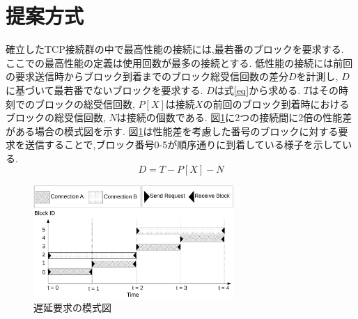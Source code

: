 \documentclass{ltjsarticle}
\begin{document}
\section{提案方式}
\vspace{-3mm}
確立したTCP接続群の中で最高性能の接続には,最若番のブロックを要求する.
ここでの最高性能の定義は使用回数が最多の接続とする.
低性能の接続には前回の要求送信時からブロック到着までのブロック総受信回数の差分\begin{math}D\end{math}を計測し,
\begin{math}D\end{math}に基づいて最若番でないブロックを要求する.
\begin{math}D\end{math}は式\ref{eq}から求める.
\begin{math}T\end{math}はその時刻でのブロックの総受信回数,
\begin{math}P[X]\end{math}は接続\begin{math}X\end{math}の前回のブロック到着時におけるブロックの総受信回数,
\begin{math}N\end{math}は接続の個数である.
図\ref{delay}に2つの接続間に2倍の性能差がある場合の模式図を示す.
図\ref{delay}は性能差を考慮した番号のブロックに対する要求を送信することで,ブロック番号0-5が順序通りに到着している様子を示している.
\vspace{-4.5mm}
\begin{equation}
	\label{eq}
	D = T - P[X] - N
\end{equation}
\vspace{-11mm}
\begin{figure}[h]
	\centering
	\includegraphics[width=7.6cm]{figure/delay.pdf}
	\vspace{-5mm}
	\caption{遅延要求の模式図}
	\label{delay}
\end{figure}
\vspace{-13.75mm}
\end{document}
